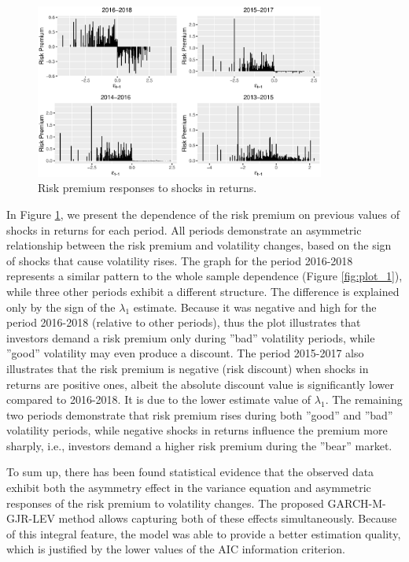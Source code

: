\documentclass[authoryear, 1p]{elsarticle}
\numberwithin{equation}{section}
\begin{document}
\begin{figure}[h!] %
\centering
\includegraphics[width=0.85\textwidth]{Plots/Plot_periods.eps}
\caption{Risk premium responses to shocks in returns.}
\label{fig:plot_2}
\end{figure}

In Figure \ref{fig:plot_2}, we present the dependence of the risk premium on previous values of shocks in returns for each period. All periods demonstrate an asymmetric relationship between the risk premium and volatility changes, based on the sign of shocks that cause volatility rises. The graph for the period 2016-2018 represents a similar pattern to the whole sample dependence (Figure \ref{fig:plot_1}), while three other periods exhibit a different structure. The difference is explained only by the sign of the $\lambda_1$ estimate. Because it was negative and high for the period 2016-2018 (relative to other periods), thus the plot illustrates that investors demand a risk premium only during ''bad'' volatility periods, while ''good'' volatility may even produce a discount. The period 2015-2017 also illustrates that the risk premium is negative (risk discount) when shocks in returns are positive ones, albeit the absolute discount value is significantly lower compared to 2016-2018. It is due to the lower estimate value of $\lambda_1$. The remaining two periods demonstrate that risk premium rises during both ''good'' and ''bad'' volatility periods, while negative shocks in returns influence the premium more sharply, i.e., investors demand a higher risk premium during the ''bear'' market.

To sum up, there has been found statistical evidence that the observed data exhibit both the asymmetry effect in the variance equation and asymmetric responses of the risk premium to volatility changes. The proposed GARCH-M-GJR-LEV method allows capturing both of these effects simultaneously. Because of this integral feature, the model was able to provide a better estimation quality, which is justified by the lower values of the AIC information criterion.
\end{document}

